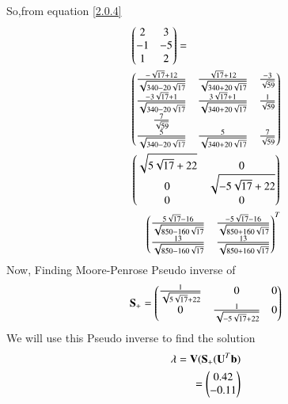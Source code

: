 \documentclass[journal,12pt,twocolumn]{IEEEtran}
\begin{document}
So,from equation \eqref{2.0.4}
\begin{align}
\begin{multlined}
\myvec{2&3\\-1&-5\\1&2}=\\
\myvec{\frac{-\sqrt{17}+12}{\sqrt{340-20\sqrt{17}}}&\frac{\sqrt{17}+12}{\sqrt{340+20\sqrt{17}}}&\frac{-3}{\sqrt{59}}\\\frac{-3\sqrt{17}+1}{\sqrt{340-20\sqrt{17}}}&\frac{3\sqrt{17}+1}{\sqrt{340+20\sqrt{17}}}&\frac{1}{\sqrt{59}}\\\frac{7}{\sqrt{59}}\\\frac{5}{\sqrt{340-20\sqrt{17}}}&\frac{5}{\sqrt{340+20\sqrt{17}}}&\frac{7}{\sqrt{59}}}\\\myvec{\sqrt{5\sqrt{17}+22}&0\\0&\sqrt{-5\sqrt{17}+22}\\0&0}\\\myvec{\frac{5\sqrt{17}-16}{\sqrt{850-160\sqrt{17}}}&\frac{-5\sqrt{17}-16}{\sqrt{850+160\sqrt{17}}}\\\frac{13}{\sqrt{850-160\sqrt{17}}}&\frac{13}{\sqrt{850+160\sqrt{17}}}}^T
\end{multlined}
\end{align}
Now, Finding Moore-Penrose Pseudo inverse of 
\begin{align}
\mathbf{S}_+=\begin{pmatrix}\frac{1}{\sqrt{5\sqrt{17}+22}}&0&0\\0&\frac{1}{\sqrt{-5\sqrt{17}+22}}&0\end{pmatrix}
\end{align}
We will use this Pseudo inverse to find the solution
\begin{align}
\lambda=\mathbf{V}(\mathbf{S}_+(\mathbf{U}^T\mathbf{b})\\
=\begin{pmatrix}0.42\\-0.11\end{pmatrix}
\end{align}

 
\end{document}
